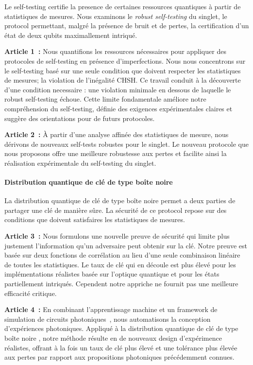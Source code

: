 Le self-testing certifie la presence de certaines ressources quantiques à partir de statistiques de mesures.
Nous examinons le \textit{robust self-testing} du singlet, le protocol permettant, malgré la présence de bruit et de pertes, la certification d'un état de deux qubits maximallement intriqué.

\medbreak

\textbf{Article 1~\cite{Valcarce2020}:} 
Nous quantifions les ressources nécessaires pour appliquer des protocoles de self-testing en présence d'imperfections.
Nous nous concentrons sur le self-testing basé sur une seule condition que doivent respecter les statistiques de mesures; la violation de l'inégalité CHSH.
Ce travail conduit à la découverte d'une condition necessaire : une violation minimale en dessous de laquelle le robust self-testing échoue.
Cette limite fondamentale améliore notre compréhension du self-testing, définie des exigences expérimentales claires et suggère des orientations pour de futurs protocoles.

\textbf{Article 2~\cite{Valcarce2022}:} 
À partir d'une analyse affinée des statistiques de mesure, nous dérivons de nouveaux self-tests robustes pour le singlet.
Le nouveau protocole que nous proposons offre une meilleure robustesse aux pertes et facilite ainsi la réalisation expérimentale du self-testing du singlet.

\paragraph{Distribution quantique de clé de type \guillemotleft boîte noire \guillemotright}

La distribution quantique de clé de type \guillemotleft boîte noire \guillemotright permet a deux parties de partager une clé de manière sûre.
La sécurité de ce protocol repose sur des conditions que doivent satisfaires les statistiques de mesures.

\medbreak

\textbf{Article 3~\cite{Sekatski2021}:}
Nous formulons une nouvelle preuve de sécurité qui limite plus justement l'information qu'un adversaire peut obtenir sur la clé.
Notre preuve est basée sur deux fonctions de corrélation au lieu d'une seule combinaison linéaire de toutes les statistiques.
Le taux de clé qui en découle est plus élevé pour les implémentations réalistes basée sur l'optique quantique et pour les états partiellement intriqués. Cependent notre appriche ne fournit pas une meilleure efficacité critique.

\textbf{Article 4~\cite{Valcarce2022b}:} 
En combinant l'apprentissage machine et un framework de simulation de circuits photoniques~\cite{Valcarce2021}, nous automatisons la conception d'expériences photoniques.
Appliqué à la distribution quantique de clé de type \guillemotleft boîte noire \guillemotright, notre méthode résulte en de nouveaux design d'expérimence réalistes, offrant à la fois un taux de clé plus élevé et une tolérance plus élevée aux pertes par rapport aux propositions photoniques précédemment connues.

